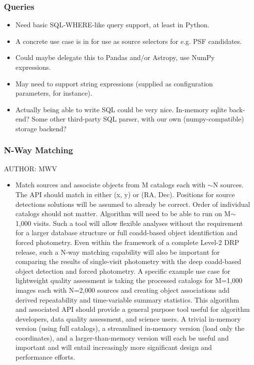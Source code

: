 \subsubsection{Queries}
\label{sec:spTablesQueries}

\begin{itemize}
\item Need basic SQL-WHERE-like query support, at least in Python.
\item A concrete use case is in for use as source selectors for e.g. PSF candidates.
\item Could maybe delegate this to Pandas and/or Astropy, use NumPy expressions.
\item May need to support string expressions (supplied as configuration parameters, for instance).
\item Actually being able to write SQL could be very nice.  In-memory sqlite back-end?  Some other third-party SQL parser, with our own (numpy-compatible) storage backend?
\end{itemize}

\subsubsection{N-Way Matching}
\label{sec:spTablesNWayMatching}
AUTHOR: MWV
\begin{itemize}
\item Match sources and associate objects from M catalogs each with $\sim$N sources.  The API should match in either (x, y) or (RA, Dec).  Positions for source detections solutions will be assumed to already be correct.  Order of individual catalogs should not matter.  Algorithm will need to be able to run on M$\sim$1,000 visits.  Such a tool will allow flexible analyses without the requirement for a larger database structure or full coadd-based object identifiction and forced photometry.  Even within the framework of a complete Level-2 DRP release, such a N-way matching capability will also be important for comparing the results of single-visit photometry with the deep coadd-based object detection and forced photometry.  A specific example use case for lightweight quality assessment is taking the processed catalogs for M=1,000 images each with N=2,000 sources and creating object associations add derived repeatability and time-variable summary statistics.  This algorithm and associated API should provide a general purpose tool useful for algorithm developers, data quality assessment, and science users.  A trivial in-memory version (using full catalogs), a streamlined in-memory version (load only the coordinates), and a larger-than-memory version will each be useful and important and will entail increasingly more significant design and performance efforts.
\end{itemize}


